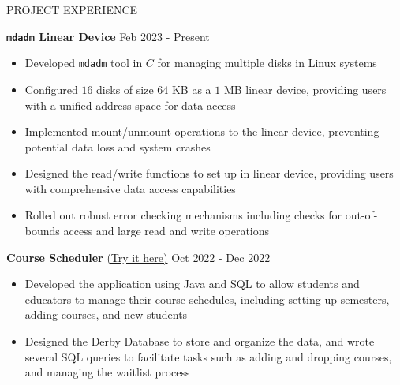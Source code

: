 \documentclass{resume} %
\begin{document}
\begin{rSection}{PROJECT EXPERIENCE}

\textbf{ \texttt{mdadm} Linear Device } \hfill Feb $2023$ - Present
\begin{itemize}
    \itemsep -3pt {}
    \item Developed \verb|mdadm| tool in $C$ for managing multiple disks in Linux systems
    \item Configured $16$ disks of size $64$ KB as a $1$ MB linear device, providing users with a unified address space for data access
    \item Implemented mount/unmount operations to the linear device, preventing potential data loss and system crashes
    \item Designed the read/write functions to set up in linear device, providing users with comprehensive data access capabilities
    \item Rolled out robust error checking mechanisms including checks for out-of-bounds access and large read and write operations

\end{itemize}

\textbf{ Course Scheduler }{\href{https://github.com/harshitjain17/OOP-with-Web-based-Applications-in-Java-CMPSC-221-assignments/tree/main/CourseSchedulerHarshitJainhmj5262}{(Try it here)}} \hfill Oct $2022$ - Dec $2022$
\begin{itemize}
    \itemsep -3pt {}
    \item Developed the application using Java and SQL to allow students and educators to manage their course schedules, including setting up semesters, adding courses, and new students
    \item Designed the Derby Database to store and organize the data, and wrote several SQL queries to facilitate tasks such as adding and dropping courses, and managing the waitlist process
\end{itemize}



\end{rSection}
\end{document}
